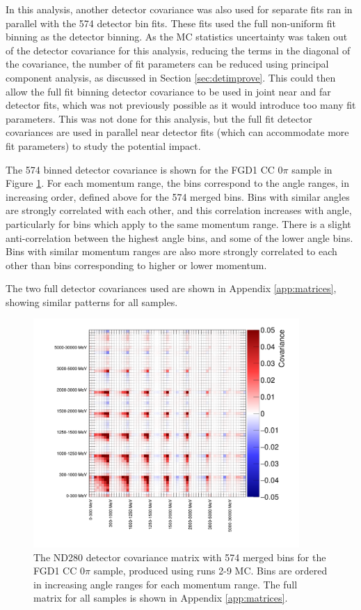 In this analysis, another detector covariance was also used for separate fits ran in parallel with the 574 detector bin fits. These fits used the full non-uniform fit binning as the detector binning. As the MC statistics uncertainty was taken out of the detector covariance for this analysis, reducing the terms in the diagonal of the covariance, the number of fit parameters can be reduced using principal component analysis, as discussed in Section \ref{sec:detimprove}. This could then allow the full fit binning detector covariance to be used in joint near and far detector fits, which was not previously possible as it would introduce too many fit parameters. This was not done for this analysis, but the full fit detector covariances are used in parallel near detector fits (which can accommodate more fit parameters) to study the potential impact.

The 574 binned detector covariance is shown for the FGD1 CC 0$\pi$ sample in Figure \ref{fig:detcorr5741sample}. For each momentum range, the bins correspond to the angle ranges, in increasing order, defined above for the 574 merged bins. Bins with similar angles are strongly correlated with each other, and this correlation increases with angle, particularly for bins which apply to the same momentum range. There is a slight anti-correlation between the highest angle bins, and some of the lower angle bins. Bins with similar momentum ranges are also more strongly correlated to each other than bins corresponding to higher or lower momentum.

The two full detector covariances used are shown in Appendix \ref{app:matrices}, showing similar patterns for all samples.

\begin{figure}[!htbp]
\centering
\includegraphics*[width=0.9\textwidth,clip]{figs/detcov574_1sample}
\caption{The ND280 detector covariance matrix with 574 merged bins for the FGD1 CC 0$\pi$ sample, produced using runs 2-9 MC. Bins are ordered in increasing angle ranges for each momentum range. The full matrix for all samples is shown in Appendix \ref{app:matrices}.}\label{fig:detcorr5741sample}
\end{figure}

